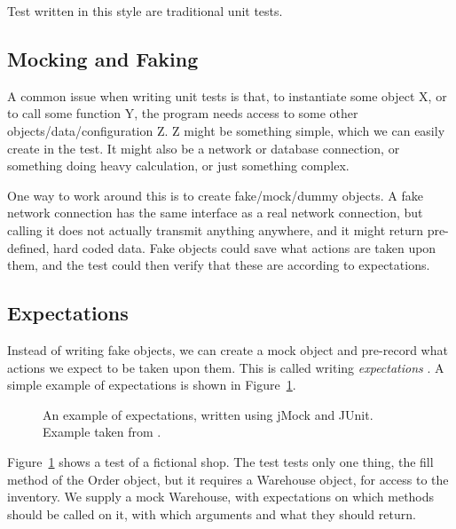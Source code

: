 \documentclass[a4paper,11pt]{kth-mag}
\begin{document}
Test written in this style are traditional unit tests.


\subsection{Mocking and Faking}

A common issue when writing unit tests is that, to instantiate some object X,
or to call some function Y, the program needs access to some other
objects/data/configuration Z. Z might be something simple, which we can easily
create in the test. It might also be a network or database connection, or
something doing heavy calculation, or just something complex.

One way to work around this is to create fake/mock/dummy objects. A fake
network connection has the same interface as a real network connection, but
calling it does not actually transmit anything anywhere, and it might return
pre-defined, hard coded data. Fake objects could save what actions are taken
upon them, and the test could then verify that these are according to
expectations.


\subsection{Expectations}

Instead of writing fake objects, we can create a mock object and pre-record
what actions we expect to be taken upon them. This is called writing
\textit{expectations} \cite{fowler07expectations}. A simple example of
expectations is shown in Figure~\ref{figure-expectations}.

\begin{figure}[h!]
	\begin{center}
	\begin{minipage}{0.7\textwidth}
		\lstset{language=Java}
		
	\end{minipage}
	\end{center}

	\caption{An example of expectations, written using jMock and JUnit.
	Example taken from \cite{fowler07expectations}.}
	\label{figure-expectations}
\end{figure}

Figure~\ref{figure-expectations} shows a test of a fictional shop. The test
tests only one thing, the fill method of the Order object, but it requires a
Warehouse object, for access to the inventory. We supply a mock Warehouse, with
expectations on which methods should be called on it, with which arguments and
what they should return.
\end{document}
